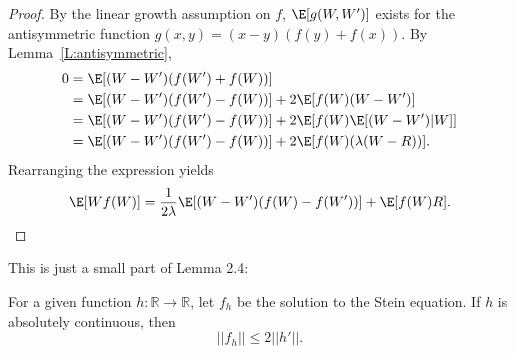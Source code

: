 \begin{proof}
  By the linear growth assumption on $f$, $\E [g(W, W')]$ exists for the antisymmetric function
  $g(x,y) = (x-y)(f(y)+f(x))$.  By Lemma~\ref{L:antisymmetric},
  \begin{equation*}
    \begin{split}
      0 &= \E [(W-W')(f(W')+f(W))] \\
      &= \E [(W-W')(f(W')-f(W))] + 2\E [f(W)(W-W')] \\
      &= \E [(W-W')(f(W')-f(W))] + 2\E [f(W)\E [(W-W')|W]] \\
      &= \E [(W-W')(f(W')-f(W))] + 2\E [f(W)(\lambda (W-R))].
    \end{split}
  \end{equation*}
  Rearranging the expression yields
  \begin{equation}
    \E [Wf(W)] = \frac{1}{2\lambda} \E [(W-W')(f(W)-f(W'))] + \E[f(W)R].
  \end{equation}
\end{proof}

This is just a small part of Lemma 2.4:
\begin{lemma}
  \label{L:stein-eq-sol-bound}
  For a given function $h: \mathbb{R} \to \mathbb{R}$, let $f_h$ be the solution to the Stein
  equation.  If $h$ is absolutely continuous, then
  \begin{equation}
    ||f_h|| \leq 2 ||h'||.    
  \end{equation}
\end{lemma}

